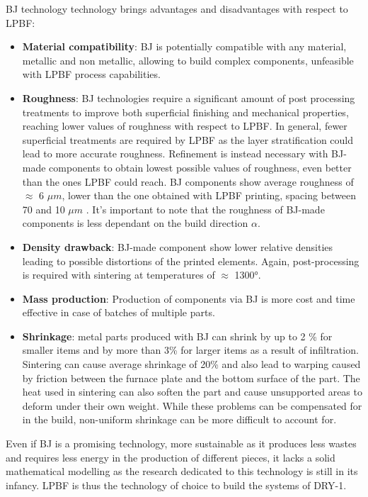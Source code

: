 BJ technology technology brings advantages and disadvantages with respect to LPBF:
\begin{itemize}
  \item \textbf{Material compatibility}: BJ is potentially compatible with any material, metallic and non metallic, allowing to build complex components, unfeasible with LPBF process capabilities.
  \item \textbf{Roughness}: BJ technologies require a significant amount of post processing treatments to improve both superficial finishing and mechanical properties, reaching lower values of roughness with respect to LPBF. In general, fewer superficial treatments are required by LPBF as the layer stratification could lead to more accurate roughness. Refinement is instead necessary with BJ-made components to obtain lowest possible values of roughness, even better than the ones LPBF could reach. BJ components show average roughness of $\approx$ 6 $\mu m$, lower than the one obtained with LPBF printing, spacing between 70 and 10 $\mu m$ \cite{tesi_dottorato}.
  It's important to note that the roughness of BJ-made components is less dependant on the build direction $\alpha$. 
  \item  \textbf{Density drawback}: BJ-made component show lower relative densities leading to possible distortions of the printed elements. Again, post-processing is required with sintering at temperatures of $\approx$ 1300°. 
  \item \textbf{Mass production}: Production of components via BJ is more cost and time effective in case of batches of multiple parts. 
  \item \textbf{Shrinkage}: metal parts produced with BJ can shrink by up to 2 \% for smaller items and by more than 3\% for larger items as a result of infiltration. Sintering can cause average shrinkage of 20\% and also lead to warping caused by friction between the furnace plate and the bottom surface of the part. The heat used in sintering can also soften the part and cause unsupported areas to deform under their own weight. While these problems can be compensated for in the build, non-uniform shrinkage can be more difficult to account for\cite{bj_camb}.
\end{itemize}

Even if BJ is a promising technology, more sustainable as it produces less wastes and requires less energy in the production of different pieces, it lacks a solid mathematical modelling\cite{bj_inconel} as the research dedicated to this technology is still in its infancy. LPBF is thus the technology of choice to build the systems of DRY-1.


